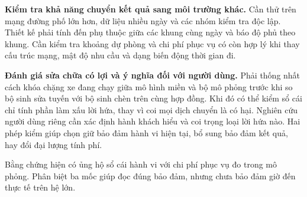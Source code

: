 \textbf{Kiểm tra khả năng chuyển kết quả sang môi trường khác.} Cần thử trên mạng
đường phố lớn hơn, dữ liệu nhiều ngày và các nhóm kiểm tra độc lập. Thiết kế phải tính đến phụ thuộc
giữa các khung cùng ngày và báo độ phủ theo khung. Cần kiểm tra khoảng dự phòng và chi phí
phục vụ có còn hợp lý khi thay cấu trúc mạng, mật độ nhu cầu và dạng biến động thời gian đi.

\textbf{Đánh giá sửa chữa có lợi và ý nghĩa đối với người dùng.} Phải thống nhất cách
khóa chặng xe đang chạy giữa mô hình miền và bộ mô phỏng trước khi so bộ sinh sửa tuyến
với bộ sinh chèn trên cùng hợp đồng. Khi đó có thể kiểm sổ cái chỉ tính phần làm xấu lời
hứa, thay vì coi mọi dịch chuyển là có hại. Nghiên cứu người dùng riêng cần xác định
hành khách hiểu và coi trọng loại lời hứa nào. Hai phép kiểm giúp chọn giữ bảo đảm hành vi hiện tại,
bổ sung bảo đảm kết quả, hay đổi đại lượng tính phí.

Bằng chứng hiện có ủng hộ sổ cái hành vi với chi phí phục vụ đo trong mô phỏng.
Phân biệt ba mốc giúp đọc đúng bảo đảm, nhưng chưa bảo đảm giờ đến thực tế trên hệ lớn.
